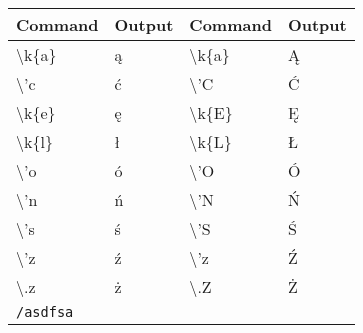 \documentclass[a4paper,11pt]{article}
\begin{document}
 
\begin{table}[htbp]
\label{Tab:SRNRValues}
\begin{center}
\begin{tabular}{|l l | l l|}
\hline
Command & Output & Command & Output \\
\hline
\textbackslash{k\{a\}}& \k{a}  &\textbackslash{k\{a\}} &\k{A} \\
\textbackslash{'c}& \'c  &\textbackslash{'C} &\'C \\
\textbackslash{k\{e\}}& ę  &\textbackslash{k\{E\}} &Ę \\
\textbackslash{k\{l\}}& ł  &\textbackslash{k\{L\}} &Ł \\
\textbackslash{'o}& ó  &\textbackslash{'O} & \'O \\
\textbackslash{'n}& ń  &\textbackslash{'N}&Ń \\
\textbackslash{'s}& ś  &\textbackslash{'S} &\'S \\
\textbackslash{'z}& \'z &\textbackslash{'z} & \'Z \\
\textbackslash{.z}& \.z  &\textbackslash{.Z} &\.Z\\
\verb|/asdfsa|\\
\hline
\end{tabular}


\end{center}
\end{table}
 
\end{document}

